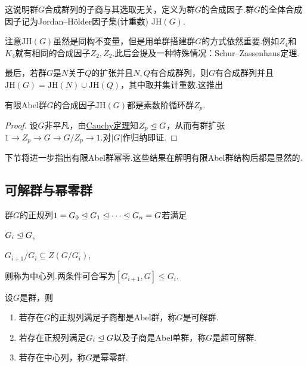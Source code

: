 这说明群$G$合成群列的子商与其选取无关，定义为群$G$的{\heiti 合成因子}.群$G$的全体合成因子记为Jordan--H\"older因子集(计重数) $\mathrm{JH}(G)$.
\begin{remark}
	注意$\mathrm{JH}(G)$虽然是同构不变量，但是用单群搭建群$G$的方式依然重要.例如$Z_4$和$K_4$就有相同的合成因子$Z_2,Z_2$.此后会提及一种特殊情况：Schur--Zassenhaus定理.
\end{remark}

最后，若群$G$是$N$关于$Q$的扩张并且$N,Q$有合成群列，则$G$有合成群列并且$\mathrm{JH}(G)=\mathrm{JH}(N)\cup\mathrm{JH}(Q)$，其中取并集计重数.这推出
\begin{prop}
	有限Abel群$G$的合成因子$\mathrm{JH}(G)$都是素数阶循环群$Z_p$.
\end{prop}
\begin{proof}
	设$G$非平凡，由\hyperlink{thm:Cauchy}{Cauchy定理}知$Z_p\trianglelefteq G$，从而有群扩张$1\to Z_p\to G\to G/Z_p\to 1$.对$|G|$作归纳即证.
\end{proof}
\begin{remark}
	下节将进一步指出有限Abel群幂零.这些结果在解明有限Abel群结构后都是显然的.
\end{remark}%
\subsection{可解群与幂零群}
\begin{definition}
	群$G$的正规列$1=G_0\trianglelefteq G_1\trianglelefteq\cdots\trianglelefteq G_n=G$若满足
	
	\begin{enumerate*}
		\item $G_i\trianglelefteq G$,\phantom{\qquad}
		\item $G_{i+1}/G_i\subseteq Z(G/G_i)$,
	\end{enumerate*}
	
	则称为{\heiti 中心列}.两条件可合写为$[G_{i+1},G]\le G_i$.
\end{definition}
\begin{definition}
	设$G$是群，则
	\begin{enumerate}
		\item 若存在$G$的正规列满足子商都是Abel群，称$G$是{\heiti 可解群}.
		\item 若存在正规列满足$G_i\trianglelefteq G$以及子商是Abel单群，称$G$是{\heiti 超可解群}.
		\item 若存在中心列，称$G$是{\heiti 幂零群}.
	\end{enumerate}
\end{definition}

